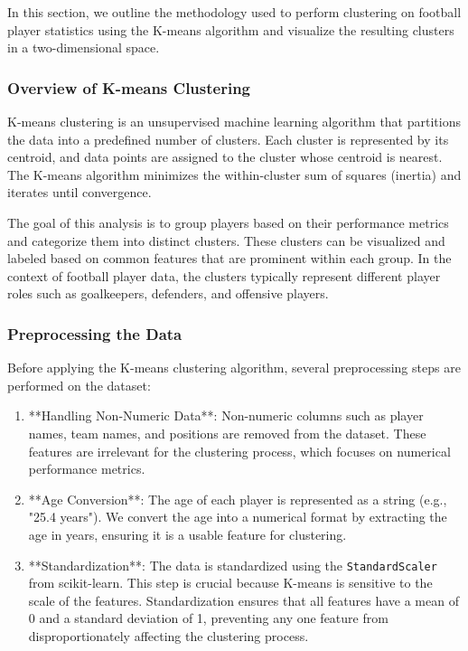 \documentclass[a4paper,12pt]{article}
\begin{document}
In this section, we outline the methodology used to perform clustering on football player statistics using the K-means algorithm and visualize the resulting clusters in a two-dimensional space.

\subsubsection{Overview of K-means Clustering}

K-means clustering is an unsupervised machine learning algorithm that partitions the data into a predefined number of clusters. Each cluster is represented by its centroid, and data points are assigned to the cluster whose centroid is nearest. The K-means algorithm minimizes the within-cluster sum of squares (inertia) and iterates until convergence.

The goal of this analysis is to group players based on their performance metrics and categorize them into distinct clusters. These clusters can be visualized and labeled based on common features that are prominent within each group. In the context of football player data, the clusters typically represent different player roles such as goalkeepers, defenders, and offensive players.

\subsubsection{Preprocessing the Data}

Before applying the K-means clustering algorithm, several preprocessing steps are performed on the dataset:

\begin{enumerate}
    \item **Handling Non-Numeric Data**: Non-numeric columns such as player names, team names, and positions are removed from the dataset. These features are irrelevant for the clustering process, which focuses on numerical performance metrics.
    \item **Age Conversion**: The age of each player is represented as a string (e.g., "25.4 years"). We convert the age into a numerical format by extracting the age in years, ensuring it is a usable feature for clustering.
    \item **Standardization**: The data is standardized using the \texttt{StandardScaler} from scikit-learn. This step is crucial because K-means is sensitive to the scale of the features. Standardization ensures that all features have a mean of 0 and a standard deviation of 1, preventing any one feature from disproportionately affecting the clustering process.
\end{enumerate}
\end{document}
